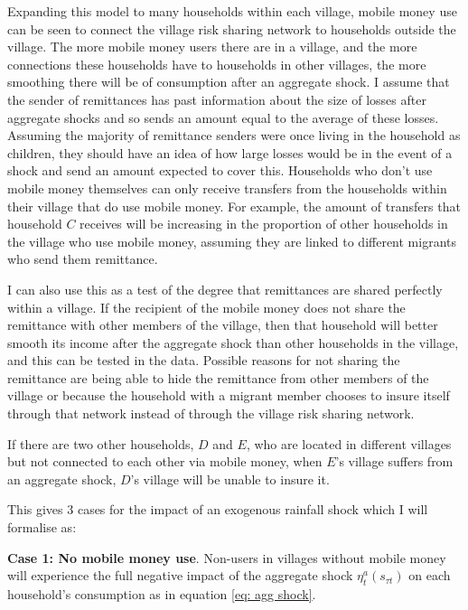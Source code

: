 Expanding this model to many households within each village, mobile money use can be seen to connect the village risk sharing network to households outside the village. The more mobile money users there are in a village, and the more connections these households have to households in other villages, the more smoothing there will be of consumption after an aggregate shock. I assume that the sender of remittances has past information about the size of losses after aggregate shocks and so sends an amount equal to the average of these losses. Assuming the majority of remittance senders were once living in the household as children, they should have an idea of how large losses would be in the event of a shock and send an amount expected to cover this.  Households who don't use mobile money themselves can only receive transfers from the households within their village that do use mobile money. For example, the amount of transfers that household $C$ receives will be increasing in the proportion of other households in the village who use mobile money, assuming they are linked to different migrants who send them remittance. 

I can also use this as a test of the degree that remittances are shared perfectly within a village. If the recipient of the mobile money does not share the remittance with other members of the village, then that household will better smooth its income after the aggregate shock than other households in the village, and this can be tested in the data. Possible reasons for not sharing the remittance are being able to hide the remittance from other members of the village or because the household with a migrant member chooses to insure itself through that network instead of through the village risk sharing network. 

If there are two other households, $D$ and $E$, who are located in different villages but not connected to each other via mobile money, when $E$'s village suffers from an aggregate shock, $D$'s village will be unable to insure it. 

This gives 3 cases for the impact of an exogenous rainfall shock which I will formalise as: 

\textbf{Case 1: No mobile money use}. Non-users in villages without mobile money will experience the full negative impact of the aggregate shock $\eta_t^a(s_{\tau t})$  on each household's consumption as in equation \eqref{eq: agg shock}. 


